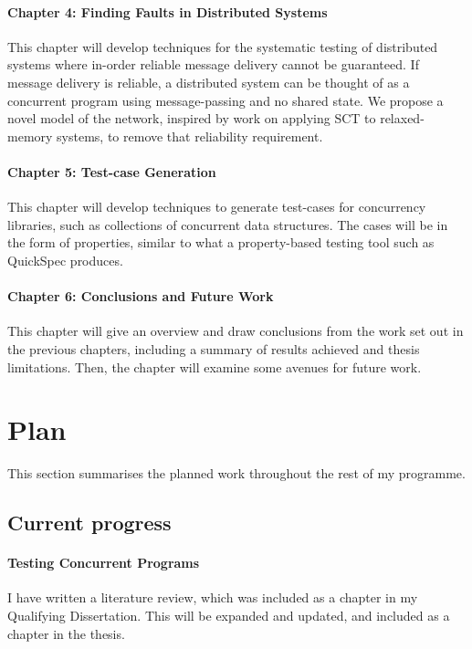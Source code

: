 \documentclass{article}
\begin{document}
\paragraph{Chapter 4: Finding Faults in Distributed Systems} This
chapter will develop techniques for the systematic testing of
distributed systems where in-order reliable message delivery cannot be
guaranteed. If message delivery is reliable, a distributed system can
be thought of as a concurrent program using message-passing and no
shared state. We propose a novel model of the network, inspired by
work on applying SCT to relaxed-memory systems\cite{zhang2015}, to
remove that reliability requirement.

\paragraph{Chapter 5: Test-case Generation} This chapter will develop
techniques to generate test-cases for concurrency libraries, such as
collections of concurrent data structures. The cases will be in the
form of properties, similar to what a property-based testing tool such
as QuickSpec\cite{claessen2010} produces.

\paragraph{Chapter 6: Conclusions and Future Work} This chapter will
give an overview and draw conclusions from the work set out in the
previous chapters, including a summary of results achieved and thesis
limitations. Then, the chapter will examine some avenues for future
work.

\section{Plan}

This section summarises the planned work throughout the rest of my
programme.

\subsection{Current progress}

\paragraph{Testing Concurrent Programs} I have written a literature
review, which was included as a chapter in my Qualifying Dissertation.
This will be expanded and updated, and included as a chapter in the
thesis.
\end{document}
